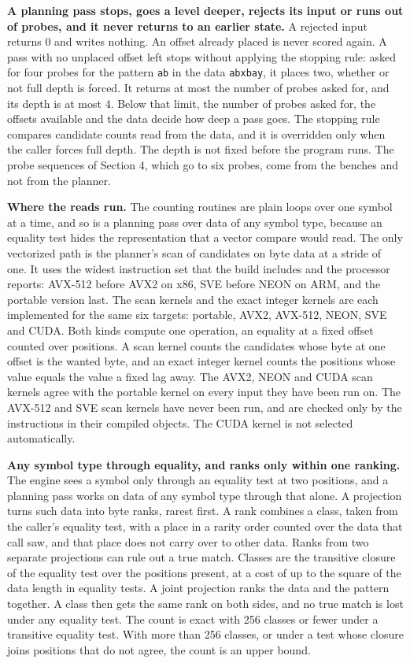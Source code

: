 \noindent\textbf{A planning pass stops, goes a level deeper, rejects its input or runs out of probes, and it never returns to an earlier state.} A rejected input returns 0 and writes nothing. An offset already placed is never scored again. A pass with no unplaced offset left stops without applying the stopping rule: asked for four probes for the pattern \texttt{ab} in the data \texttt{abxbay}, it places two, whether or not full depth is forced. It returns at most the number of probes asked for, and its depth is at most 4. Below that limit, the number of probes asked for, the offsets available and the data decide how deep a pass goes. The stopping rule compares candidate counts read from the data, and it is overridden only when the caller forces full depth. The depth is not fixed before the program runs. The probe sequences of Section 4, which go to six probes, come from the benches and not from the planner.

\noindent\textbf{Where the reads run.} The counting routines are plain loops over one symbol at a time, and so is a planning pass over data of any symbol type, because an equality test hides the representation that a vector compare would read. The only vectorized path is the planner's scan of candidates on byte data at a stride of one. It uses the widest instruction set that the build includes and the processor reports: AVX-512 before AVX2 on x86, SVE before NEON on ARM, and the portable version last. The scan kernels and the exact integer kernels are each implemented for the same six targets: portable, AVX2, AVX-512, NEON, SVE and CUDA. Both kinds compute one operation, an equality at a fixed offset counted over positions. A scan kernel counts the candidates whose byte at one offset is the wanted byte, and an exact integer kernel counts the positions whose value equals the value a fixed lag away. The AVX2, NEON and CUDA scan kernels agree with the portable kernel on every input they have been run on. The AVX-512 and SVE scan kernels have never been run, and are checked only by the instructions in their compiled objects. The CUDA kernel is not selected automatically.

\noindent\textbf{Any symbol type through equality, and ranks only within one ranking.} The engine sees a symbol only through an equality test at two positions, and a planning pass works on data of any symbol type through that alone. A projection turns such data into byte ranks, rarest first. A rank combines a class, taken from the caller's equality test, with a place in a rarity order counted over the data that call saw, and that place does not carry over to other data. Ranks from two separate projections can rule out a true match. Classes are the transitive closure of the equality test over the positions present, at a cost of up to the square of the data length in equality tests. A joint projection ranks the data and the pattern together. A class then gets the same rank on both sides, and no true match is lost under any equality test. The count is exact with 256 classes or fewer under a transitive equality test. With more than 256 classes, or under a test whose closure joins positions that do not agree, the count is an upper bound.

